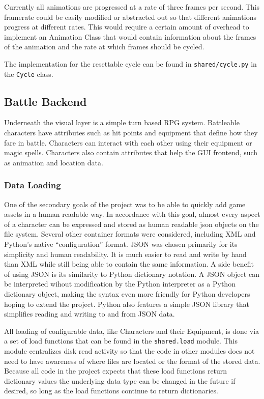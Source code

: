 \documentclass[11pt]{article}
\begin{document}
Currently all animations are progressed at a rate of three frames per second.  This framerate could be easily modified or abstracted out so that different animations progress at different rates.  This would require a certain amount of overhead to implement an Animation Class that would contain information about the frames of the animation and the rate at which frames should be cycled. 

The implementation for the resettable cycle can be found in \texttt{shared/cycle.py} in the \texttt{Cycle} class. 

\subsection{Battle Backend}

Underneath the visual layer is a simple turn based RPG system.  Battleable characters have attributes such as hit points and equipment that define how they fare in battle.  Characters can interact with each other using their equipment or magic spells.  Characters also contain attributes that help the GUI frontend, such as animation and location data.

\subsubsection{Data Loading}

One of the secondary goals of the project was to be able to quickly add game assets in a human readable way.  In accordance with this goal, almost every aspect of a character can be expressed and stored as human readable json objects on the file system.  Several other container formats were considered, including XML and Python's native ``configuration'' format.  JSON \cite{JSON} was chosen primarily for its simplicity and human readability.  It is much easier to read and write by hand than XML while still being able to contain the same information.  A side benefit of using JSON is its similarity to Python dictionary notation.  A JSON object can be interpreted wihout modification by the Python interpreter as a Python dictionary object, making the syntax even more friendly for Python developers hoping to extend the project.  Python also features a simple JSON library that simplifies reading and writing to and from JSON data.

All loading of configurable data, like Characters and their Equipment, is done via a set of load functions that can be found in the \texttt{shared.load} module. This module centralizes disk read activity so that the code in other modules does not need to have awareness of where files are located or the format of the stored data.  Because all code in the project expects that these load functions return dictionary values the underlying data type can be changed in the future if desired, so long as the load functions continue to return dictionaries.
\end{document}

